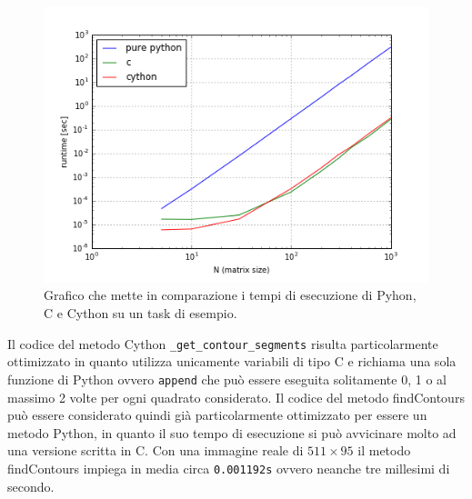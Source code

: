 \documentclass[12pt,a4paper]{report}
\begin{document}
\begin{figure}[H]
    \centering
    \includegraphics[scale=0.9]{img/cython-vs-c.png}
    \caption{Grafico che mette in comparazione i tempi di esecuzione di Pyhon, C e Cython su un task di esempio. 
}
\end{figure} 
Il codice del metodo Cython \verb|_get_contour_segments| risulta particolarmente ottimizzato in quanto utilizza unicamente variabili di tipo C e richiama una sola funzione di Python ovvero \verb|append| che può essere eseguita solitamente 0, 1 o al massimo 2 volte per ogni quadrato considerato. 
Il codice del metodo findContours può essere considerato quindi già particolarmente ottimizzato per essere un metodo Python, in quanto il suo tempo di esecuzione si può avvicinare molto ad una versione scritta in C. \newline
Con una immagine reale di $511\times 95$ il metodo findContours impiega in media circa \verb|0.001192s| %
ovvero neanche tre millesimi di secondo.
\end{document}
